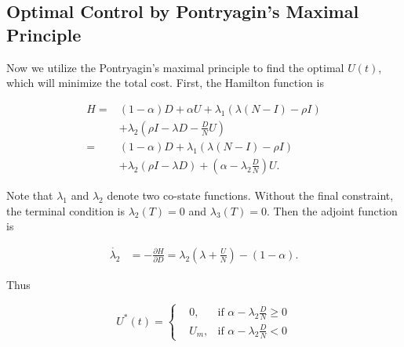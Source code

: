 \subsection{Optimal Control by Pontryagin's Maximal Principle}
Now we utilize the Pontryagin's maximal principle to find the optimal $U(t)$, which will minimize the total cost.
First, the Hamilton function is
\begin{small}
\begin{equation}
\nonumber
\begin{aligned}
H =& (1-\alpha) D + \alpha U + \lambda_{1} (\lambda (N-I) - \rho I) \\
& + \lambda_{2} (\rho I  - \lambda D - \frac{D}{N} U) \\
=& (1-\alpha) D + \lambda_{1} (\lambda (N-I) - \rho I) \\
& + \lambda_{2} (\rho I  - \lambda D) + ( \alpha - \lambda_{2} \frac{D}{N}) U.
\end{aligned}
\end{equation}
\end{small}
Note that $\lambda_{1}$ and $\lambda_{2}$ denote two co-state functions.
Without the final constraint, the terminal condition is $\lambda_{2}(T) = 0$ and $\lambda_{3}(T) = 0$.
Then the adjoint function is
\begin{small}
\begin{equation}
\nonumber
\begin{aligned}
\dot{\lambda_{2}} &= - \frac{ \partial H}{ \partial D} = \lambda_{2} (\lambda + \frac{U}{N} ) - (1-\alpha).
\end{aligned}
\end{equation}
\end{small}

Thus
\begin{small}
\begin{equation}
\label{eq:opt_U}
U^{*}(t) =
\left\{
\begin{aligned}
&0,      & \text{if }  \alpha - \lambda_{2} \frac{D}{N} \ge 0 \\
&U_{m},        & \text{if } \alpha - \lambda_{2} \frac{D}{N} < 0
\end{aligned}
\right.
\end{equation}
\end{small}

